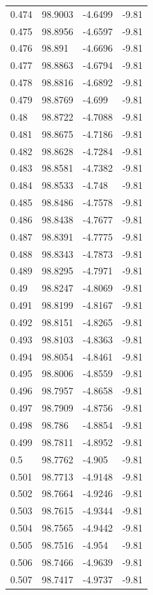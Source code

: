 \begin{tabular}{llll}
0.474 & 98.9003 & -4.6499 & -9.81 \\
0.475 & 98.8956 & -4.6597 & -9.81 \\
0.476 & 98.891 & -4.6696 & -9.81 \\
0.477 & 98.8863 & -4.6794 & -9.81 \\
0.478 & 98.8816 & -4.6892 & -9.81 \\
0.479 & 98.8769 & -4.699 & -9.81 \\
0.48 & 98.8722 & -4.7088 & -9.81 \\
0.481 & 98.8675 & -4.7186 & -9.81 \\
0.482 & 98.8628 & -4.7284 & -9.81 \\
0.483 & 98.8581 & -4.7382 & -9.81 \\
0.484 & 98.8533 & -4.748 & -9.81 \\
0.485 & 98.8486 & -4.7578 & -9.81 \\
0.486 & 98.8438 & -4.7677 & -9.81 \\
0.487 & 98.8391 & -4.7775 & -9.81 \\
0.488 & 98.8343 & -4.7873 & -9.81 \\
0.489 & 98.8295 & -4.7971 & -9.81 \\
0.49 & 98.8247 & -4.8069 & -9.81 \\
0.491 & 98.8199 & -4.8167 & -9.81 \\
0.492 & 98.8151 & -4.8265 & -9.81 \\
0.493 & 98.8103 & -4.8363 & -9.81 \\
0.494 & 98.8054 & -4.8461 & -9.81 \\
0.495 & 98.8006 & -4.8559 & -9.81 \\
0.496 & 98.7957 & -4.8658 & -9.81 \\
0.497 & 98.7909 & -4.8756 & -9.81 \\
0.498 & 98.786 & -4.8854 & -9.81 \\
0.499 & 98.7811 & -4.8952 & -9.81 \\
0.5 & 98.7762 & -4.905 & -9.81 \\
0.501 & 98.7713 & -4.9148 & -9.81 \\
0.502 & 98.7664 & -4.9246 & -9.81 \\
0.503 & 98.7615 & -4.9344 & -9.81 \\
0.504 & 98.7565 & -4.9442 & -9.81 \\
0.505 & 98.7516 & -4.954 & -9.81 \\
0.506 & 98.7466 & -4.9639 & -9.81 \\
0.507 & 98.7417 & -4.9737 & -9.81 \\

\end{tabular}
